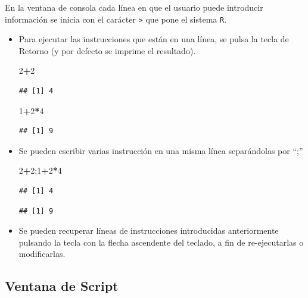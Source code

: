 \documentclass[]{book}
\newenvironment{Shaded}{\begin{snugshade}}{\end{snugshade}}
\newcommand{\DecValTok}[1]{\textcolor[rgb]{0.00,0.00,0.81}{#1}}
\newcommand{\NormalTok}[1]{#1}
\newcommand{\OperatorTok}[1]{\textcolor[rgb]{0.81,0.36,0.00}{\textbf{#1}}}
\begin{document}
En la ventana de consola cada línea en que el usuario puede
introducir información se inicia con el carácter \texttt{\textgreater{}} que pone el sistema
\texttt{R}.

\begin{itemize}
\item
  Para ejecutar las instrucciones que están en una línea, se pulsa la
  tecla de Retorno (y por defecto se imprime el resultado).

\begin{Shaded}
\begin{Highlighting}[]
\DecValTok{2}\OperatorTok{+}\DecValTok{2}
\end{Highlighting}
\end{Shaded}

\begin{verbatim}
## [1] 4
\end{verbatim}

\begin{Shaded}
\begin{Highlighting}[]
\DecValTok{1}\OperatorTok{+}\DecValTok{2}\OperatorTok{*}\DecValTok{4}
\end{Highlighting}
\end{Shaded}

\begin{verbatim}
## [1] 9
\end{verbatim}
\item
  Se pueden escribir varias instrucción en una misma línea
  separándolas por ``;''

\begin{Shaded}
\begin{Highlighting}[]
\DecValTok{2}\OperatorTok{+}\DecValTok{2}\NormalTok{;}\DecValTok{1}\OperatorTok{+}\DecValTok{2}\OperatorTok{*}\DecValTok{4}
\end{Highlighting}
\end{Shaded}

\begin{verbatim}
## [1] 4
\end{verbatim}

\begin{verbatim}
## [1] 9
\end{verbatim}
\item
  Se pueden recuperar líneas de instrucciones introducidas
  anteriormente pulsando la tecla con la flecha ascendente del
  teclado, a fin de re-ejecutarlas o modificarlas.
\end{itemize}

\hypertarget{ventana-de-script}{%
\subsection{Ventana de Script}\label{ventana-de-script}}
\end{document}
